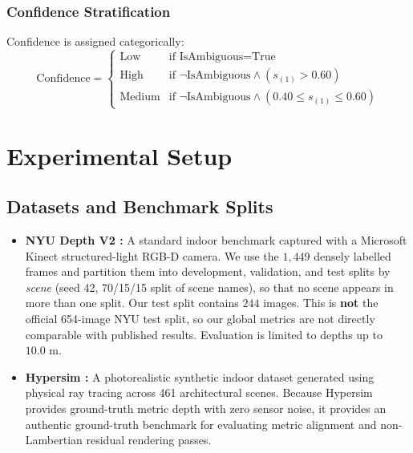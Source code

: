 \documentclass[11pt,a4paper]{article}
\begin{document}
\subsubsection{Confidence Stratification}
Confidence is assigned categorically:
\begin{equation}
\label{eq:confidence}
\text{Confidence} = \begin{cases}
\text{Low} & \text{if } \text{IsAmbiguous} = \text{True} \\
\text{High} & \text{if } \neg\text{IsAmbiguous} \land (s_{(1)} > 0.60) \\
\text{Medium} & \text{if } \neg\text{IsAmbiguous} \land (0.40 \le s_{(1)} \le 0.60)
\end{cases}
\end{equation}

\section{Experimental Setup}
\label{sec:setup}

\subsection{Datasets and Benchmark Splits}
\begin{itemize}
    \item \textbf{NYU Depth V2 \citep{silberman2012indoor}:} A standard indoor benchmark captured with a Microsoft Kinect structured-light RGB-D camera. We use the $1,449$ densely labelled frames and partition them into development, validation, and test splits by \emph{scene} (seed 42, 70/15/15 split of scene names), so that no scene appears in more than one split. Our test split contains $244$ images. This is \textbf{not} the official 654-image NYU test split, so our global metrics are not directly comparable with published results. Evaluation is limited to depths up to $10.0\text{ m}$.
    \item \textbf{Hypersim \citep{roberts2021hypersim}:} A photorealistic synthetic indoor dataset generated using physical ray tracing across 461 architectural scenes. Because Hypersim provides ground-truth metric depth with zero sensor noise, it provides an authentic ground-truth benchmark for evaluating metric alignment and non-Lambertian residual rendering passes.
\end{itemize}
\end{document}
